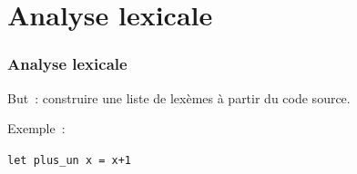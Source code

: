 
\label{seclexer}
\section{Analyse lexicale}


\begin{frame}
    \frametitle{Analyse lexicale}

    But~: construire une liste de lexèmes à partir du code source.

    \pause
    Exemple~:

    \begin{center}
    \texttt{let plus_un x = x+1}
    \end{center}

    \pause
    


\end{frame}

